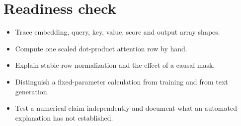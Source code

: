 \documentclass[11pt,letterpaper]{article}
\theoremstyle{definition}\newtheorem{definition}{Definition}\newtheorem{example}{Example}
\numberwithin{equation}{section}
\begin{document}
\section*{Readiness check}
\begin{itemize}
\item Trace embedding, query, key, value, score and output array shapes.
\item Compute one scaled dot-product attention row by hand.
\item Explain stable row normalization and the effect of a causal mask.
\item Distinguish a fixed-parameter calculation from training and from text generation.
\item Test a numerical claim independently and document what an automated explanation has not established.
\end{itemize}
\end{document}
